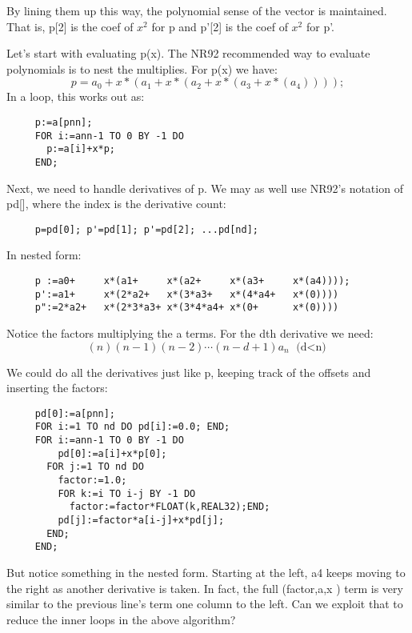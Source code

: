 By lining them up this way, the polynomial sense of the
vector is maintained.  That is, p[2] is the coef of $x^2$ for p
and p'[2] is the coef of $x^2$ for p'.

Let's start with evaluating p(x).  The NR92 recommended way
to evaluate polynomials is to nest the multiplies.  For p(x)
we have:
\begin{equation}
     p=a_0+x*(a_1+x*(a_2+x*(a_3+x*(a_4))));
\end{equation}
In a loop, this works out as:
\begin{verbatim}
     p:=a[pnn];
     FOR i:=ann-1 TO 0 BY -1 DO
       p:=a[i]+x*p;
     END;
\end{verbatim}

Next, we need to handle derivatives of p.  We may as well
use NR92's notation of pd[], where the index is the
derivative count:
\begin{verbatim}
     p=pd[0]; p'=pd[1]; p'=pd[2]; ...pd[nd];
\end{verbatim}

In nested form:
\begin{verbatim}
     p :=a0+     x*(a1+     x*(a2+     x*(a3+     x*(a4))));
     p':=a1+     x*(2*a2+   x*(3*a3+   x*(4*a4+   x*(0))))
     p":=2*a2+   x*(2*3*a3+ x*(3*4*a4+ x*(0+      x*(0))))
\end{verbatim}

Notice the factors multiplying the a terms.  For the dth
derivative we need:
\begin{equation}
     (n)(n-1)(n-2) \cdots (n-d+1) a_n \mbox{\ (d$<$n)}
\end{equation}

We could do all the derivatives just like p, keeping track
of the offsets and inserting the factors:
\begin{verbatim}
     pd[0]:=a[pnn];
     FOR i:=1 TO nd DO pd[i]:=0.0; END;
     FOR i:=ann-1 TO 0 BY -1 DO
         pd[0]:=a[i]+x*p[0];
       FOR j:=1 TO nd DO
         factor:=1.0;
         FOR k:=i TO i-j BY -1 DO
           factor:=factor*FLOAT(k,REAL32);END;
         pd[j]:=factor*a[i-j]+x*pd[j];
       END;
     END;
\end{verbatim}

But notice something in the nested form.  Starting at the
left, a4 keeps moving to the right as another derivative is
taken.  In fact, the full (factor,a,x ) term is very similar
to the previous line's term one column to the left.  Can we
exploit that to reduce the inner loops in the above
algorithm?

